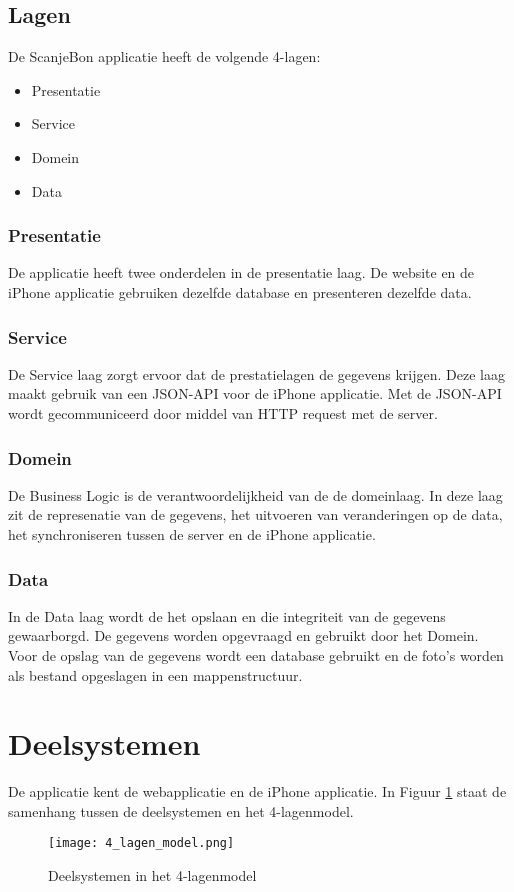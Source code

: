 \documentclass[a4paper,11pt,oneside]{report}
\begin{document}
\subsection{Lagen}
De ScanjeBon applicatie heeft de volgende 4-lagen:
\begin{itemize}
  \item Presentatie
  \item Service
  \item Domein
  \item Data
\end{itemize}

\subsubsection{Presentatie}
De applicatie heeft twee onderdelen in de presentatie laag. De website en
de iPhone applicatie gebruiken dezelfde database en presenteren dezelfde data.
\subsubsection{Service}
De Service laag zorgt ervoor dat de prestatielagen de gegevens krijgen. Deze
laag maakt gebruik van een JSON-API voor de iPhone applicatie. Met de JSON-API
wordt gecommuniceerd door middel van HTTP request met de server.
\subsubsection{Domein}
De Business Logic is de verantwoordelijkheid van de de domeinlaag. In deze laag
zit de represenatie van de gegevens, het uitvoeren van veranderingen op de data,
het synchroniseren tussen de server en de iPhone applicatie.
\subsubsection{Data}
In de Data laag wordt de het opslaan en die integriteit van de gegevens
gewaarborgd. De gegevens worden opgevraagd en gebruikt door het Domein. Voor de
opslag van de gegevens wordt een database gebruikt en de foto's worden als
bestand opgeslagen in een mappenstructuur.

\newpage
\section{Deelsystemen}
De applicatie kent de webapplicatie en de iPhone applicatie. In
Figuur \ref{fig:vier_lagen_model} staat de samenhang tussen de deelsystemen en
het 4-lagenmodel.
\begin{figure}[ht!]
\centering
\texttt{[image: 4\_lagen\_model.png]}\\
\caption{Deelsystemen in het 4-lagenmodel}
\label{fig:vier_lagen_model}
\end{figure}
\end{document}

